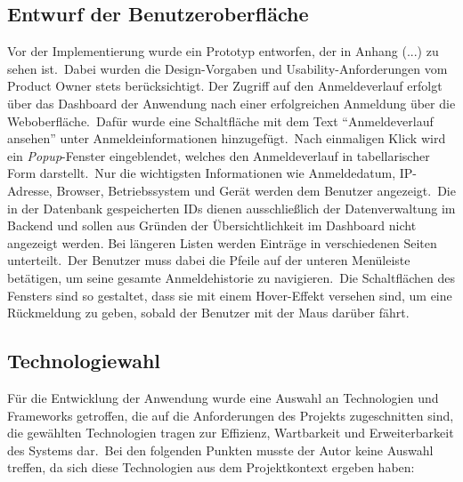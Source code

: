 %

\subsection{Entwurf der Benutzeroberfläche}
\label{subsec:Benutzeroberflaeche}

Vor der Implementierung wurde ein Prototyp entworfen, der in Anhang (...) zu sehen ist.\ Dabei wurden die Design-Vorgaben und Usability-Anforderungen vom Product Owner stets berücksichtigt.
Der Zugriff auf den Anmeldeverlauf erfolgt über das Dashboard der Anwendung nach einer erfolgreichen Anmeldung über die Weboberfläche.\ Dafür wurde eine Schaltfläche mit dem Text "`Anmeldeverlauf ansehen"' unter
Anmeldeinformationen hinzugefügt.\ Nach einmaligen Klick wird ein \textit{Popup}-Fenster eingeblendet, welches den Anmeldeverlauf in tabellarischer Form darstellt.\ Nur die wichtigsten Informationen wie Anmeldedatum, IP-Adresse,
Browser, Betriebssystem und Gerät werden dem Benutzer angezeigt.\ Die in der Datenbank gespeicherten IDs dienen ausschließlich der Datenverwaltung im Backend und sollen aus Gründen der Übersichtlichkeit im Dashboard nicht angezeigt werden.
Bei längeren Listen werden Einträge in verschiedenen Seiten unterteilt.\ Der Benutzer muss dabei die Pfeile auf der unteren Menüleiste betätigen, um seine gesamte Anmeldehistorie zu navigieren.\ Die Schaltflächen des Fensters sind
so gestaltet, dass sie mit einem Hover-Effekt versehen sind, um eine Rückmeldung zu geben, sobald der Benutzer mit der Maus darüber fährt.\

\subsection{Technologiewahl}
\label{subsec:Technologiewahl}

Für die Entwicklung der Anwendung wurde eine Auswahl an Technologien und Frameworks getroffen, die auf die Anforderungen des Projekts zugeschnitten sind, die gewählten Technologien
tragen zur Effizienz, Wartbarkeit und Erweiterbarkeit des Systems dar.\ Bei den folgenden Punkten musste der Autor keine Auswahl treffen, da sich diese Technologien aus dem Projektkontext ergeben
haben:

